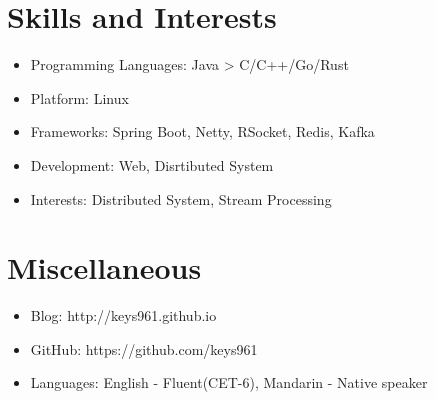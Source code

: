 \documentclass{resume}
\begin{document}

\section{Skills and Interests}
\begin{itemize}[parsep=0.5ex]
  \item Programming Languages: Java > C/C++/Go/Rust
  \item Platform: Linux
  \item Frameworks: Spring Boot, Netty, RSocket, Redis, Kafka
  \item Development: Web, Disrtibuted System
  \item Interests: Distributed System, Stream Processing 
\end{itemize}

\section{Miscellaneous}
\begin{itemize}[parsep=0.5ex]
  \item Blog: http://keys961.github.io
  \item GitHub: https://github.com/keys961
  \item Languages: English - Fluent(CET-6), Mandarin - Native speaker
\end{itemize}

%
%
\end{document}
